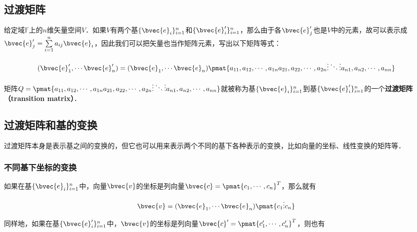 
\subsection{过渡矩阵}
给定域$\mathbb{F}$上的$n$维矢量空间$V$．如果$V$有两个基$\{\bvec{e}_i\}_{i=1}^{n}$和$\{\bvec{e}'_i\}_{i=1}^{n}$，那么由于各$\bvec{e}'_j$也是$V$中的元素，故可以表示成$\bvec{e}'_j=\sum\limits_{i=1}^na_{ij}\bvec{e}_i$，因此我们可以把矢量也当作矩阵元素，写出以下矩阵等式：

\begin{equation}\label{TransM_eq1}
(\bvec{e}'_1, \cdots\bvec{e}'_n)=(\bvec{e}_1, \cdots\bvec{e}_n)\pmat{a_{11},a_{12},\cdots,a_{1n}\newline a_{21},a_{22},\cdots,a_{2n}\newline\vdots\ddots\vdots\newline a_{n1},a_{n2},\cdots,a_{nn}}
\end{equation}

矩阵$Q=\pmat{a_{11},a_{12},\cdots,a_{1n}\newline a_{21},a_{22},\cdots,a_{2n}\newline\vdots\ddots\vdots\newline a_{n1},a_{n2},\cdots,a_{nn}}$就被称为基$\{\bvec{e}_i\}_{i=1}^{n}$到基$\{\bvec{e}'_i\}_{i=1}^{n}$的一个\textbf{过渡矩阵（transition matrix）}．

\subsection{过渡矩阵和基的变换}

过渡矩阵本身是表示基之间的变换的，但它也可以用来表示两个不同的基下各种表示的变换，比如向量的坐标、线性变换的矩阵等．

\subsubsection{不同基下坐标的变换}


如果在基$\{\bvec{e}_i\}_{i=1}^{n}$中，向量$\bvec{v}$的坐标是列向量$\bvec{c}=\pmat{c_1,\cdots, c_n}^T$，那么就有

\begin{equation}\label{TransM_eq2}
\bvec{v}=(\bvec{e}_1, \cdots\bvec{e}_n)\pmat{c_1\newline\vdots\newline c_n}
\end{equation}

同样地，如果在基$\{\bvec{e}'_i\}_{i=1}^{n}$中，$\bvec{v}$的坐标是列向量$\bvec{c}'=\pmat{c'_1,\cdots, c'_n}^T$，则也有

